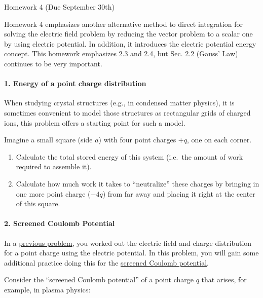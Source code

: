 \documentclass[11pt]{article}
\def\tightlist{}
\begin{document}
{\LARGE Homework 4 (Due September
30th)}\label{homework-4-due-september-30th}

Homework 4 emphasizes another alternative method to direct integration
for solving the electric field problem by reducing the vector problem to
a scalar one by using electric potential. In addition, it introduces the
electric potential energy concept. This homework emphasizes 2.3 and 2.4,
but Sec. 2.2 (Gauss' Law) continues to be very important.

\paragraph{1. Energy of a point charge
distribution}\label{energy-of-a-point-charge-distribution}

When studying crystal structures (e.g., in condensed matter physics), it
is sometimes convenient to model those structures as rectangular grids
of charged ions, this problem offers a starting point for such a model.

Imagine a small square (side \(a\)) with four point charges \(+q\), one
on each corner.

\begin{enumerate}
\def\labelenumi{\arabic{enumi}.}
\tightlist
\item
  Calculate the total stored energy of this system (i.e.~the amount of
  work required to assemble it).
\item
  Calculate how much work it takes to ``neutralize'' these charges by
  bringing in one more point charge (\(-4q\)) from far away and placing
  it right at the center of this square.
\end{enumerate}

\paragraph{2. Screened Coulomb
Potential}\label{screened-coulomb-potential}

In a
\href{./homework3.html\#connecting-potential-electric-field-and-charge}{previous
problem}, you worked out the electric field and charge distribution for
a point charge using the electric potential. In this problem, you will
gain some additional practice doing this for the
\href{https://en.wikipedia.org/wiki/Electric-field_screening}{screened
Coulomb potential}.

Consider the ``screened Coulomb potential'' of a point charge \(q\) that
arises, for example, in plasma physics:
\end{document}
